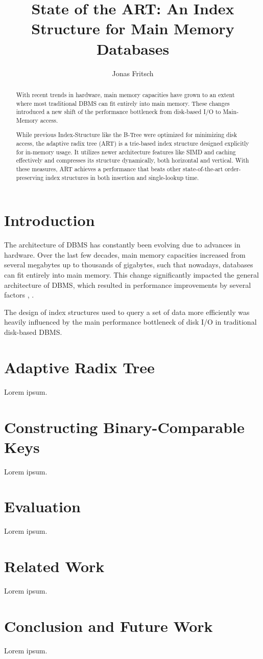 \documentclass[acmtog, nonacm]{acmart}
\begin{document}
\title{State of the ART: An Index Structure for Main Memory Databases}

\author{Jonas Fritsch}

\begin{abstract}
    With recent trends in hardware, main memory capacities have grown to an extent where most traditional DBMS 
    can fit entirely into main memory. These changes introduced a new shift of the performance bottleneck 
    from disk-based I/O to Main-Memory access.
    
    While previous Index-Structure like the B-Tree were optimized for minimizing disk access, the 
    adaptive radix tree (ART) is a trie-based index structure designed explicitly for in-memory usage. 
    It utilizes newer architecture features like SIMD and caching effectively and compresses its structure 
    dynamically, both horizontal and vertical. With these measures, ART achieves a performance that beats 
    other state-of-the-art order-preserving index structures in both insertion and single-lookup time.
\end{abstract}

\maketitle

\section{Introduction}
The architecture of DBMS has constantly been evolving due to advances in hardware. 
Over the last few decades, main memory capacities increased from several megabytes up to thousands 
of gigabytes, such that nowadays, databases can fit entirely into main memory. This change significantly 
impacted the general architecture of DBMS, which resulted in performance improvements 
by several factors \cite{harizopoulos2018oltp}, \cite{zhang2015memory}.

The design of index structures used to query a set of data more efficiently was heavily influenced by 
the main performance bottleneck of disk I/O in traditional disk-based DBMS.

\section{Adaptive Radix Tree}
Lorem ipsum.

\section{Constructing Binary-Comparable Keys}
Lorem ipsum.

\section{Evaluation}
Lorem ipsum.

\section{Related Work}
Lorem ipsum.

\section{Conclusion and Future Work}
Lorem ipsum.



\end{document}
